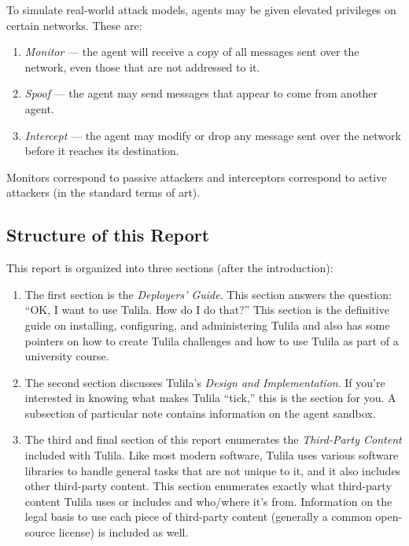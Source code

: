 \documentclass[12pt]{article}
\begin{document}
To simulate real-world attack models, agents may be given elevated privileges on certain networks. These are:
\begin{enumerate}
  \item \textit{Monitor} --- the agent will receive a copy of all messages sent over the network, even those that are not addressed to it.
  \item \textit{Spoof} --- the agent may send messages that appear to come from another agent.
  \item \textit{Intercept} --- the agent may modify or drop any message sent over the network before it reaches its destination.
\end{enumerate}

Monitors correspond to passive attackers and interceptors correspond to active attackers (in the standard terms of art).

\subsection{Structure of this Report}

This report is organized into three sections (after the introduction):

\begin{enumerate}
  \item The first section is the \textit{Deployers' Guide}. This section answers the question: ``OK, I want to use Tulila. How do I do that?'' This section is the definitive guide on installing, configuring, and administering Tulila and also has some pointers on how to create Tulila challenges and how to use Tulila as part of a university course.
  \item The second section discusses Tulila's \textit{Design and Implementation}. If you're interested in knowing what makes Tulila ``tick,'' this is the section for you. A subsection of particular note contains information on the agent sandbox.
  \item The third and final section of this report enumerates the \textit{Third-Party Content} included with Tulila. Like most modern software, Tulila uses various software libraries to handle general tasks that are not unique to it, and it also includes other third-party content. This section enumerates exactly what third-party content Tulila uses or includes and who/where it's from. Information on the legal basis to use each piece of third-party content (generally a common open-source license) is included as well.
\end{enumerate}
\end{document}
